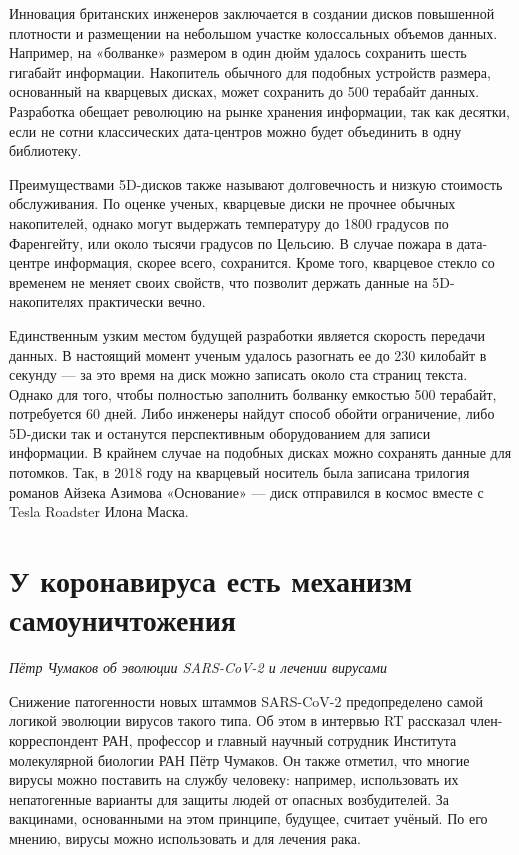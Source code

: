 Инновация британских инженеров заключается в создании дисков повышенной плотности и размещении на небольшом участке колоссальных объемов данных. Например, на «болванке» размером в один дюйм удалось сохранить шесть гигабайт информации. Накопитель обычного для подобных устройств размера, основанный на кварцевых дисках, может сохранить до 500 терабайт данных. Разработка обещает революцию на рынке хранения информации, так как десятки, если не сотни классических дата-центров можно будет объединить в одну библиотеку.

Преимуществами 5D-дисков также называют долговечность и низкую стоимость обслуживания. По оценке ученых, кварцевые диски не прочнее обычных накопителей, однако могут выдержать температуру до 1800 градусов по Фаренгейту, или около тысячи градусов по Цельсию. В случае пожара в дата-центре информация, скорее всего, сохранится. Кроме того, кварцевое стекло со временем не меняет своих свойств, что позволит держать данные на 5D-накопителях практически вечно.

Единственным узким местом будущей разработки является скорость передачи данных. В настоящий момент ученым удалось разогнать ее до 230 килобайт в секунду — за это время на диск можно записать около ста страниц текста. Однако для того, чтобы полностью заполнить болванку емкостью 500 терабайт, потребуется 60 дней. Либо инженеры найдут способ обойти ограничение, либо 5D-диски так и останутся перспективным оборудованием для записи информации. В крайнем случае на подобных дисках можно сохранять данные для потомков. Так, в 2018 году на кварцевый носитель была записана трилогия романов Айзека Азимова «Основание» — диск отправился в космос вместе с Tesla Roadster Илона Маска.



\section{У коронавируса есть механизм самоуничтожения}
\textit{Пётр Чумаков об эволюции SARS-CoV-2 и лечении вирусами}

Снижение патогенности новых штаммов SARS-CoV-2 предопределено самой логикой эволюции вирусов такого типа. Об этом в интервью RT рассказал член-корреспондент РАН, профессор и главный научный сотрудник Института молекулярной биологии РАН Пётр Чумаков. Он также отметил, что многие вирусы можно поставить на службу человеку: например, использовать их непатогенные варианты для защиты людей от опасных возбудителей. За вакцинами, основанными на этом принципе, будущее, считает учёный. По его мнению, вирусы можно использовать и для лечения рака.

